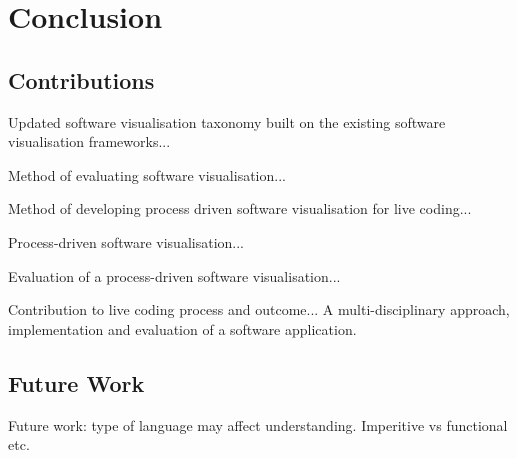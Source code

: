 
\chapter{Conclusion}



\section{Contributions}

Updated software visualisation taxonomy built on the existing software visualisation frameworks...

Method of evaluating software visualisation...

Method of developing process driven software visualisation for live coding...

Process-driven software visualisation...

Evaluation of a process-driven software visualisation...

Contribution to live coding process and outcome... A multi-disciplinary approach, implementation and evaluation of a software application.

\section{Future Work}

Future work: type of language may affect understanding. Imperitive vs functional etc.


